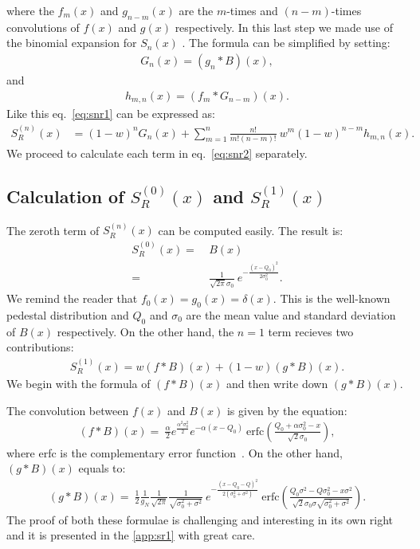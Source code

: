 \documentclass[preprint,12pt]{elsarticle}
\begin{document}
where the $f_m(x)$ and $g_{n-m}(x)$ are the $m$-times and $(n-m)$-times convolutions of $f(x)$ and $g(x)$ respectively. 
In this last step we made use of the binomial expansion for $S_n(x)$ \cite{error}. 
The formula can be simplified by setting:
\begin{align}
G_n(x) = (g_{n} *B )(x), 
\end{align}
and 
\begin{align}
h_{m,n}(x) = (f_{m} * G_{n-m} )(x).  
\end{align}
Like this eq.~\eqref{eq:snr1} can be expressed as:
\begin{align}
S^{(n)}_R(x) & = (1-w)^n G_n(x) + \sum_{m=1}^{n}  \frac{n!}{m!(n-m)!} \ w^m (1-w)^{n-m} h_{m,n}(x). \label{eq:snr2}
\end{align}
We proceed to calculate each term in eq.~\eqref{eq:snr2} separately.  


\subsection{Calculation of $S^{(0)}_R(x)$ and $S^{(1)}_R(x)$}
%

The zeroth term of $S^{(n)}_R(x)$ can be computed easily. 
The result is:
\begin{align}
S^{(0)}_R(x)  = \ & B(x) \nonumber \\
                      = \ & \frac{1}{\sqrt{2\pi}\sigma_0} \ e^{-\frac{(x-Q_0)^2}{2\sigma_0^2}}.
\end{align}
We remind the reader that $f_0(x)=g_0(x)=\delta (x)$. 
This is the well-known pedestal distribution and $Q_0$ and $\sigma_0$ are the mean value and standard deviation of $B(x)$ respectively. 
On the other hand, the $n=1$ term recieves two contributions:
\begin{align}
S^{(1)}_R(x)  = w (f*B)(x) + (1-w)(g*B)(x). 
\end{align}                     
We begin with the formula of $(f*B)(x)$ and then write down $(g*B)(x)$.

The convolution between $f(x)$ and $B(x)$ is given by the equation:
\begin{align}
(f*B)(x)  = \ \frac{\alpha}{2} e^{\frac{\alpha^2\sigma_0^2}{2}} e^{-\alpha (x-Q_0)} \ \text{erfc}\left( \frac{Q_0 + \alpha\sigma_0^2 - x }{\sqrt{2}\sigma_0} \right),
\end{align}  
where erfc is the complementary error function~\cite{error}.
On the other hand, $(g*B)(x)$ equals to:
\begin{align}
(g*B)(x)  = \ \frac{1}{2} \frac{1}{g_N} \frac{1}{\sqrt{2\pi}} \frac{1}{\sqrt{\sigma_0^2 + \sigma^2}} \ e^{ -\frac{ (x-Q_0-Q)^2 }{2(\sigma_0^2 + \sigma^2)}} 
\ \text{erfc}\left(  \frac{ Q_0\sigma^2 -Q\sigma_0^2 -x \sigma^2  }{\sqrt{2} \sigma_0\sigma\sqrt{\sigma_0^2 + \sigma^2} }   \right).
\end{align}  
The proof of both these formulae is challenging and interesting in its own right and it is presented in the \ref{app:sr1} with great care. 
\end{document}

